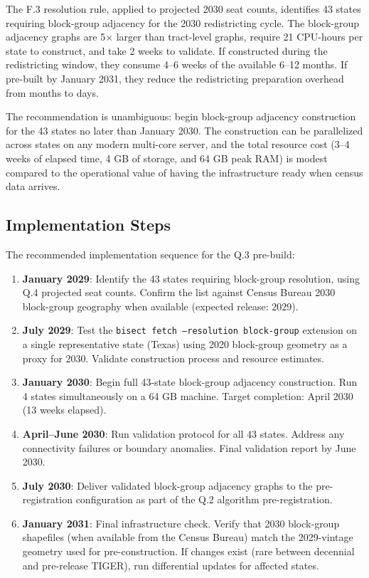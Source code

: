 \label{sec:conclusion}

The F.3 resolution rule, applied to projected 2030 seat counts, identifies 43 states
requiring block-group adjacency for the 2030 redistricting cycle. The block-group
adjacency graphs are 5$\times$ larger than tract-level graphs, require 21 CPU-hours
per state to construct, and take 2 weeks to validate. If constructed during the
redistricting window, they consume 4--6 weeks of the available 6--12 months.
If pre-built by January 2031, they reduce the redistricting preparation overhead
from months to days.

The recommendation is unambiguous: begin block-group adjacency construction for
the 43 states no later than January 2030. The construction can be parallelized
across states on any modern multi-core server, and the total resource cost (3--4 weeks
of elapsed time, 4 GB of storage, and 64 GB peak RAM) is modest compared to the
operational value of having the infrastructure ready when census data arrives.

\subsection{Implementation Steps}

The recommended implementation sequence for the Q.3 pre-build:

\begin{enumerate}
\item \textbf{January 2029}: Identify the 43 states requiring block-group resolution,
  using Q.4 projected seat counts. Confirm the list against Census Bureau 2030
  block-group geography when available (expected release: 2029).

\item \textbf{July 2029}: Test the \texttt{bisect fetch --resolution block-group}
  extension on a single representative state (Texas) using 2020 block-group geometry
  as a proxy for 2030. Validate construction process and resource estimates.

\item \textbf{January 2030}: Begin full 43-state block-group adjacency construction.
  Run 4 states simultaneously on a 64 GB machine. Target completion: April 2030
  (13 weeks elapsed).

\item \textbf{April--June 2030}: Run validation protocol for all 43 states.
  Address any connectivity failures or boundary anomalies. Final validation report
  by June 2030.

\item \textbf{July 2030}: Deliver validated block-group adjacency graphs to the
  pre-registration configuration as part of the Q.2 algorithm pre-registration.

\item \textbf{January 2031}: Final infrastructure check. Verify that 2030 block-group
  shapefiles (when available from the Census Bureau) match the 2029-vintage geometry
  used for pre-construction. If changes exist (rare between decennial and pre-release
  TIGER), run differential updates for affected states.
\end{enumerate}

